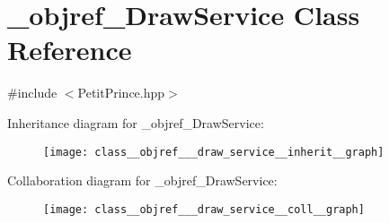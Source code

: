 \hypertarget{class__objref___draw_service}{}\section{\+\_\+objref\+\_\+\+Draw\+Service Class Reference}
\label{class__objref___draw_service}


{\ttfamily \#include $<$Petit\+Prince.\+hpp$>$}



Inheritance diagram for \+\_\+objref\+\_\+\+Draw\+Service\+:
\nopagebreak
\begin{figure}[H]
\begin{center}
\leavevmode
\texttt{[image: class\_\_objref\_\_\_draw\_service\_\_inherit\_\_graph]}
\end{center}
\end{figure}


Collaboration diagram for \+\_\+objref\+\_\+\+Draw\+Service\+:
\nopagebreak
\begin{figure}[H]
\begin{center}
\leavevmode
\texttt{[image: class\_\_objref\_\_\_draw\_service\_\_coll\_\_graph]}
\end{center}
\end{figure}
